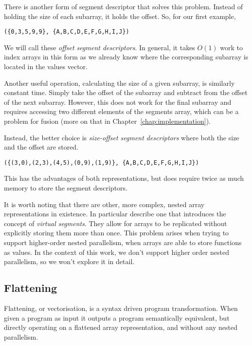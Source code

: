 There is another form of segment descriptor that solves this problem. Instead of holding the size of each subarray, it holds the offset. So, for our first example,
%
\begin{lstlisting}
({0,3,5,9,9}, {A,B,C,D,E,F,G,H,I,J})
\end{lstlisting}
%
We will call these \emph{offset segment descriptors}. In general, it takes $O(1)$ work to index arrays in this form as we already know where the corresponding subarray is located in the values vector.

Another useful operation, calculating the size of a given subarray, is similarly constant time. Simply take the offset of the subarray and subtract from the offset of the next subarray. However, this does not work for the final subarray and requires accessing two different elements of the segments array, which can be a problem for fusion (more on that in Chapter~\ref{chap:implementation}).

Instead, the better choice is \emph{size-offset segment descriptors} where both the size and the offset are stored.
%
\begin{lstlisting}
({(3,0),(2,3),(4,5),(0,9),(1,9)}, {A,B,C,D,E,F,G,H,I,J})
\end{lstlisting}
%
This has the advantages of both representations, but does require twice as much memory to store the segment descriptors.


It is worth noting that there are other, more complex, nested array representations in existence. In particular \citet{Lippmeier:replicate} describe one that introduces the concept of \emph{virtual segments}. They allow for arrays to be replicated without explicitly storing them more than once. This problem arises when trying to support higher-order nested parallelism, when arrays are able to store functions as values. In the context of this work, we don't support higher order nested parallelism, so we won't explore it in detail.

\subsection{Flattening}

Flattening, or vectorisation, is a syntax driven program transformation. When given a program as input it outputs a program semantically equivalent, but directly operating on a flattened array representation, and without any nested parallelism.


